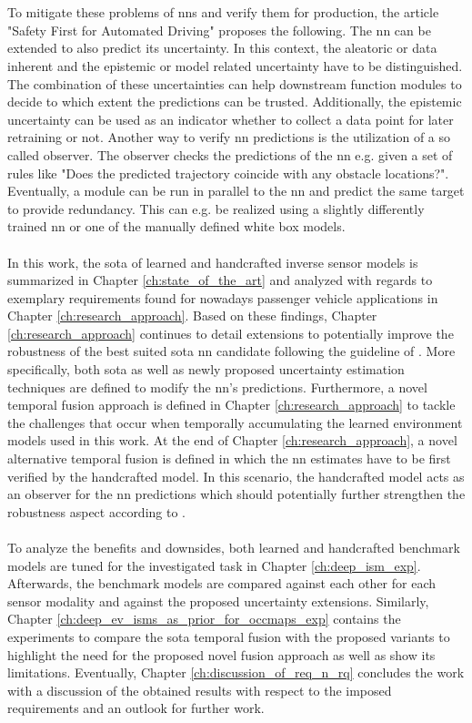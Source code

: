 \\\\
To mitigate these problems of \gls{nn}s and verify them for production, the article "Safety First for Automated Driving" \cite{safetyfirst2019} proposes the following. The \gls{nn} can be extended to also predict its uncertainty. In this context, the aleatoric or data inherent and the epistemic or model related uncertainty have to be distinguished. The combination of these uncertainties can help downstream function modules to decide to which extent the predictions can be trusted. Additionally, the epistemic uncertainty can be used as an indicator whether to collect a data point for later retraining or not. Another way to verify \gls{nn} predictions is the utilization of a so called observer. The observer checks the predictions of the \gls{nn} e.g. given a set of rules like "Does the predicted trajectory coincide with any obstacle locations?". Eventually, a module can be run in parallel to the \gls{nn} and predict the same target to provide redundancy. This can e.g. be realized using a slightly differently trained \gls{nn} or one of the manually defined white box models.
\\\\
In this work, the \gls{sota} of learned and handcrafted inverse sensor models is summarized in Chapter \ref{ch:state_of_the_art} and analyzed with regards to exemplary requirements found for nowadays passenger vehicle applications in Chapter \ref{ch:research_approach}. Based on these findings, Chapter \ref{ch:research_approach} continues to detail extensions to potentially improve the robustness of the best suited \gls{sota} \gls{nn} candidate following the guideline of \cite{safetyfirst2019}. More specifically, both \gls{sota} as well as newly proposed uncertainty estimation techniques are defined to modify the \gls{nn}'s predictions. Furthermore, a novel temporal fusion approach is defined in Chapter \ref{ch:research_approach} to tackle the challenges that occur when temporally accumulating the learned environment models used in this work. At the end of Chapter \ref{ch:research_approach}, a novel alternative temporal fusion is defined in which the \gls{nn} estimates have to be first verified by the handcrafted model. In this scenario, the handcrafted model acts as an observer for the \gls{nn} predictions which should potentially further strengthen the robustness aspect according to \cite{safetyfirst2019}.
\\\\
To analyze the benefits and downsides, both learned and handcrafted benchmark models are tuned for the investigated task in Chapter \ref{ch:deep_ism_exp}. Afterwards, the benchmark models are compared against each other for each sensor modality and against the proposed uncertainty extensions. Similarly, Chapter \ref{ch:deep_ev_isms_as_prior_for_occmaps_exp} contains the experiments to compare the \gls{sota} temporal fusion with the proposed variants to highlight the need for the proposed novel fusion approach as well as show its limitations. Eventually, Chapter \ref{ch:discussion_of_req_n_rq} concludes the work with a discussion of the obtained results with respect to the imposed requirements and an outlook for further work.
